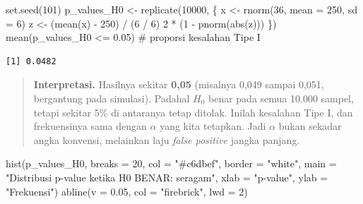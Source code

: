 \documentclass[
  indonesian,
  letterpaper,
]{book}
\newenvironment{Shaded}{\begin{snugshade}}{\end{snugshade}}
\newcommand{\AttributeTok}[1]{\textcolor[rgb]{0.40,0.45,0.13}{#1}}
\newcommand{\CommentTok}[1]{\textcolor[rgb]{0.37,0.37,0.37}{#1}}
\newcommand{\DecValTok}[1]{\textcolor[rgb]{0.68,0.00,0.00}{#1}}
\newcommand{\FloatTok}[1]{\textcolor[rgb]{0.68,0.00,0.00}{#1}}
\newcommand{\FunctionTok}[1]{\textcolor[rgb]{0.28,0.35,0.67}{#1}}
\newcommand{\NormalTok}[1]{\textcolor[rgb]{0.00,0.23,0.31}{#1}}
\newcommand{\OtherTok}[1]{\textcolor[rgb]{0.00,0.23,0.31}{#1}}
\newcommand{\SpecialCharTok}[1]{\textcolor[rgb]{0.37,0.37,0.37}{#1}}
\newcommand{\StringTok}[1]{\textcolor[rgb]{0.13,0.47,0.30}{#1}}
\begin{document}
\begin{Shaded}
\begin{Highlighting}[]
\FunctionTok{set.seed}\NormalTok{(}\DecValTok{101}\NormalTok{)}
\NormalTok{p\_values\_H0 }\OtherTok{\textless{}{-}} \FunctionTok{replicate}\NormalTok{(}\DecValTok{10000}\NormalTok{, \{}
\NormalTok{  x }\OtherTok{\textless{}{-}} \FunctionTok{rnorm}\NormalTok{(}\DecValTok{36}\NormalTok{, }\AttributeTok{mean =} \DecValTok{250}\NormalTok{, }\AttributeTok{sd =} \DecValTok{6}\NormalTok{)}
\NormalTok{  z }\OtherTok{\textless{}{-}}\NormalTok{ (}\FunctionTok{mean}\NormalTok{(x) }\SpecialCharTok{{-}} \DecValTok{250}\NormalTok{) }\SpecialCharTok{/}\NormalTok{ (}\DecValTok{6} \SpecialCharTok{/} \DecValTok{6}\NormalTok{)}
  \DecValTok{2} \SpecialCharTok{*}\NormalTok{ (}\DecValTok{1} \SpecialCharTok{{-}} \FunctionTok{pnorm}\NormalTok{(}\FunctionTok{abs}\NormalTok{(z)))}
\NormalTok{\})}
\FunctionTok{mean}\NormalTok{(p\_values\_H0 }\SpecialCharTok{\textless{}=} \FloatTok{0.05}\NormalTok{)   }\CommentTok{\# proporsi kesalahan Tipe I}
\end{Highlighting}
\end{Shaded}

\begin{verbatim}
[1] 0.0482
\end{verbatim}

\begin{quote}
\textbf{Interpretasi.} Hasilnya sekitar \textbf{0,05} (misalnya 0,049
sampai 0,051, bergantung pada simulasi). Padahal \(H_0\) benar pada
semua 10.000 sampel, tetapi sekitar 5\% di antaranya tetap ditolak.
Inilah kesalahan Tipe I, dan frekuensinya sama dengan \(\alpha\) yang
kita tetapkan. Jadi \(\alpha\) bukan sekadar angka konvensi, melainkan
laju \emph{false positive} jangka panjang.
\end{quote}

\begin{Shaded}
\begin{Highlighting}[]
\FunctionTok{hist}\NormalTok{(p\_values\_H0, }\AttributeTok{breaks =} \DecValTok{20}\NormalTok{, }\AttributeTok{col =} \StringTok{"\#c6dbef"}\NormalTok{, }\AttributeTok{border =} \StringTok{"white"}\NormalTok{,}
     \AttributeTok{main =} \StringTok{"Distribusi p{-}value ketika H0 BENAR: seragam"}\NormalTok{, }\AttributeTok{xlab =} \StringTok{"p{-}value"}\NormalTok{, }\AttributeTok{ylab =} \StringTok{"Frekuensi"}\NormalTok{)}
\FunctionTok{abline}\NormalTok{(}\AttributeTok{v =} \FloatTok{0.05}\NormalTok{, }\AttributeTok{col =} \StringTok{"firebrick"}\NormalTok{, }\AttributeTok{lwd =} \DecValTok{2}\NormalTok{)}
\end{Highlighting}
\end{Shaded}
\end{document}
